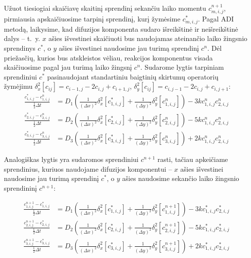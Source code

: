 Užuot tiesiogiai skaičiavę skaitinį sprendinį sekančiu laiko momentu $c^{n+1}_{m,i,j}$, pirmiausia apskaičiuosime tarpinį sprendinį, kurį žymėsime $c^*_{m,i,j}$. Pagal ADI metodą, laikysime, kad difuzijos komponenta sudaro išreikštinė ir neišreikštinė dalys -- \hbox{t. y.} $x$ ašies išvestinei skaičiuoti bus naudojamas ateinančio laiko žingsnio sprendinys $c^*$, o $y$ ašies išvestinei naudosime jau turimą sprendinį $c^n$. Dėl priežasčių, kurios bus atskleistos vėliau, reakcijos komponentus visada skaičiuosime pagal jau turimą laiko žingsnį $c^n$. Sudarome lygtis tarpiniam sprendiniui $c^*$ pasinaudojant standartiniu baigtinių skirtumų operatorių žymėjimu $\delta_x^2[c_{ij}]=c_{i-1,j}-2c_{i,j}+c_{i+1,j}$, $\delta_y^2[c_{ij}]=c_{i,j-1}-2c_{i,j}+c_{i,j+1}$:
\begin{subequations} \label{eqs:adi-half-step}
\begin{align}
	\frac{c^*_{1,i,j} - c^n_{1,i,j}}{\frac{1}{2}\Delta t} &= D_1 \left( \frac{1}{(\Delta x)^2}\delta_x^2[c^*_{1,i,j}] + \frac{1}{(\Delta y)^2}\delta_y^2[c^n_{1,i,j}] \right) - 3kc^n_{1,i,j}c^n_{2,i,j}\\
	\frac{c^*_{2,i,j} - c^n_{2,i,j}}{\frac{1}{2}\Delta t} &= D_2 \left( \frac{1}{(\Delta x)^2}\delta_x^2[c^*_{2,i,j}] + \frac{1}{(\Delta y)^2}\delta_y^2[c^n_{2,i,j}] \right) - 5kc^n_{1,i,j}c^n_{2,i,j}\\
	\frac{c^*_{3,i,j} - c^n_{3,i,j}}{\frac{1}{2}\Delta t} &= D_3 \left( \frac{1}{(\Delta x)^2}\delta_x^2[c^*_{3,i,j}] + \frac{1}{(\Delta y)^2}\delta_y^2[c^n_{3,i,j}] \right) +2kc^n_{1,i,j}c^n_{2,i,j}
\end{align}
\end{subequations}

Analogiškas lygtis yra sudaromos sprendiniui $c^{n+1}$ rasti, tačiau apkeičiame sprendinius, kuriuos naudojame difuzijos komponentui -- $x$ ašies išvestinei naudosime jau turimą sprendinį $c^{*}$, o $y$ ašies naudosime sekančio laiko žingsnio sprendininį $c^{n+1}$:

\begin{subequations} \label{eqs:adi-next-step}
\begin{align}
	\frac{c^{n+1}_{1,i,j} - c^*_{1,i,j}}{\frac{1}{2}\Delta t} 
	&= D_1 \left( \frac{1}{(\Delta x)^2}\delta_x^2[c^{*}_{1,i,j}] 
	+ \frac{1}{(\Delta y)^2}\delta_y^2[c^{n+1}_{1,i,j}] \right) - 3kc^*_{1,i,j}c^*_{2,i,j}\\
	\frac{c^{n+1}_{2,i,j} - c^*_{2,i,j}}{\frac{1}{2}\Delta t} 
	&= D_2 \left( \frac{1}{(\Delta x)^2}\delta_x^2[c^*_{2,i,j}] 
	+ \frac{1}{(\Delta y)^2}\delta_y^2[c^{n+1}_{2,i,j}] \right) - 5kc^*_{1,i,j}c^*_{2,i,j}\\
	\frac{c^{n+1}_{3,i,j} - c^*_{3,i,j}}{\frac{1}{2}\Delta t} 
	&= D_3 \left( \frac{1}{(\Delta x)^2}\delta_x^2[c^*_{3,i,j}] 
	+ \frac{1}{(\Delta y)^2}\delta_y^2[c^{n+1}_{3,i,j}] \right) +2kc^*_{1,i,j}c^*_{2,i,j}
\end{align}
\end{subequations}

